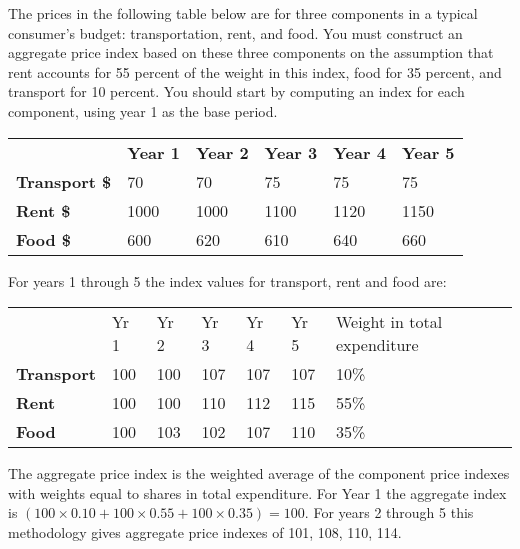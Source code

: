 \begin{enumialphparenastyle}
\begin{ex}\label{ex:ch2ex4}
The prices in the following table below are for three components in a typical consumer's budget: transportation, rent, and food. You must construct an aggregate price index based on these three components on the assumption that rent accounts for 55 percent of the weight in this index, food for 35 percent, and transport for 10 percent. You should start by computing an index for each component, using year 1 as the base period.
\begin{center}
\begin{tabu} to \linewidth {|X[2.5,c]X[1,c]X[1,c]X[1,c]X[1,c]X[1,c]|}	\hline
{}		&	\textbf{Year 1}	&	\textbf{Year 2}	&	\textbf{Year 3}	&	\textbf{Year 4}	&	\textbf{Year 5}	\\
\textbf{Transport \$}	&	70		&	70		&	75		&	75		&	75		\\
	\textbf{Rent \$}			&	1000	&	1000	&	1100	&	1120	&	1150	\\
\textbf{Food \$}			&	600		&	620		&	610		&	640		&	660		\\	\hline
\end{tabu}
\end{center}
\begin{sol}
	For years 1 through 5 the index values for transport, rent and food are:
	\begin{center}
	\begin{tabu} to \linewidth {|X[1.25,l]X[1,c]X[1,c]X[1,c]X[1,c]X[1,c]X[4,c]|}	\hline
			& Yr 1 & Yr 2 & Yr 3 & Yr 4 & Yr 5 & Weight in total expenditure \\
		\textbf{Transport} & 100 & 100 & 107 & 107 & 107 & 10\% \\
			\textbf{Rent} & 100 & 100 & 110 & 112 & 115 & 55\% \\
		\textbf{Food} & 100 & 103 & 102 & 107 & 110 & 35\% \\ \hline
	\end{tabu}
	\end{center}
	The aggregate price index is the weighted average of the component price indexes with weights equal to shares in total expenditure. For Year 1 the aggregate index is $(100\times 0.10+100\times 0.55+100\times 0.35)=100$. For years 2 through 5 this methodology gives aggregate price indexes of 101, 108, 110, 114.
	
\end{sol}
\end{ex}


\end{enumialphparenastyle}
